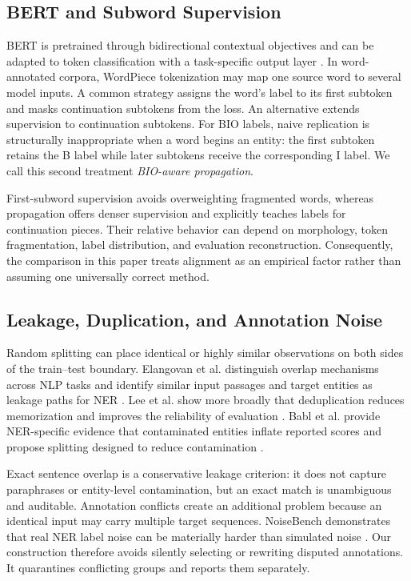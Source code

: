 \documentclass[conference]{IEEEtran}
\begin{document}
\subsection{BERT and Subword Supervision}
BERT is pretrained through bidirectional contextual objectives and can be adapted to token classification with a task-specific output layer \cite{devlin2019bert}. In word-annotated corpora, WordPiece tokenization may map one source word to several model inputs. A common strategy assigns the word's label to its first subtoken and masks continuation subtokens from the loss. An alternative extends supervision to continuation subtokens. For BIO labels, naive replication is structurally inappropriate when a word begins an entity: the first subtoken retains the B label while later subtokens receive the corresponding I label. We call this second treatment \emph{BIO-aware propagation}.

First-subword supervision avoids overweighting fragmented words, whereas propagation offers denser supervision and explicitly teaches labels for continuation pieces. Their relative behavior can depend on morphology, token fragmentation, label distribution, and evaluation reconstruction. Consequently, the comparison in this paper treats alignment as an empirical factor rather than assuming one universally correct method.

\subsection{Leakage, Duplication, and Annotation Noise}
Random splitting can place identical or highly similar observations on both sides of the train--test boundary. Elangovan et al. distinguish overlap mechanisms across NLP tasks and identify similar input passages and target entities as leakage paths for NER \cite{elanggovan2021memorization}. Lee et al. show more broadly that deduplication reduces memorization and improves the reliability of evaluation \cite{lee2022deduplicating}. Babl et al. provide NER-specific evidence that contaminated entities inflate reported scores and propose splitting designed to reduce contamination \cite{babl2025random}.

Exact sentence overlap is a conservative leakage criterion: it does not capture paraphrases or entity-level contamination, but an exact match is unambiguous and auditable. Annotation conflicts create an additional problem because an identical input may carry multiple target sequences. NoiseBench demonstrates that real NER label noise can be materially harder than simulated noise \cite{merdjanovska2024noisebench}. Our construction therefore avoids silently selecting or rewriting disputed annotations. It quarantines conflicting groups and reports them separately.
\end{document}

